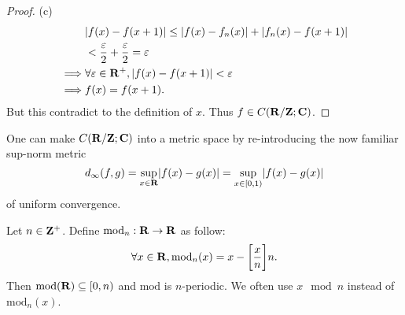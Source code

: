 \begin{proof}{(c)}
\begin{align*}
                 & \abs{f(x) - f(x + 1)} \leq \abs{f(x) - f_n(x)} + \abs{f_n(x) - f(x + 1)}                                             \\
                 & < \frac{\varepsilon}{2} + \frac{\varepsilon}{2} = \varepsilon                                                        \\
        \implies & \forall \varepsilon \in \R^+, \abs{f(x) - f(x + 1)} < \varepsilon                                                    \\
        \implies & f(x) = f(x + 1).
    \end{align*}
    But this contradict to the definition of \(x\).
    Thus \(f \in C(\mathbf{R} / \mathbf{Z} ; \mathbf{C})\).
\end{proof}

\begin{note}
    One can make \(C(\mathbf{R} / \mathbf{Z} ; \mathbf{C})\) into a metric space by re-introducing the now familiar sup-norm metric
    \[
        d_\infty(f, g) = \sup_{x \in \R} \abs{f(x) - g(x)} = \sup_{x \in [0, 1)} \abs{f(x) - g(x)}
    \]
    of uniform convergence.
\end{note}

\begin{additional corollary}\label{ac 5.1.1}
Let \(n \in \mathbf{Z}^+\).
Define \(\text{mod}_n : \mathbf{R} \to \mathbf{R}\) as follow:
\[
    \forall x \in \mathbf{R}, \text{mod}_n(x) = x - \bigg[\frac{x}{n}\bigg] n.
\]
Then \(\text{mod}(\mathbf{R}) \subseteq [0, n)\) and \(\text{mod}\) is \(n\)-periodic.
We often use \(x \mod n\) instead of \(\text{mod}_n(x)\).
\end{additional corollary}

